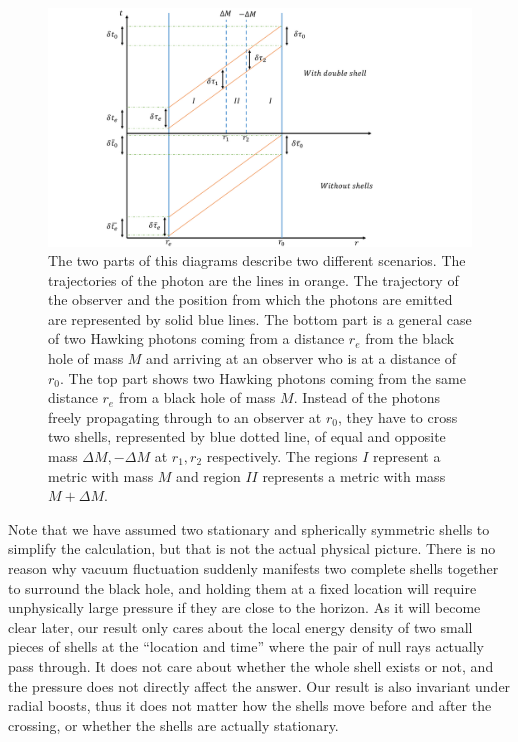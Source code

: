 \documentclass[aps,showpacs,onecolumn,floats,prd,superscriptaddress,nofootinbib]{revtex4-1}
\begin{document}
\begin{figure}[tb]
\begin{center}
\includegraphics[scale = 0.6]{Propertime.pdf}
\caption{The two parts of this diagrams describe two different scenarios. The trajectories of the photon are the lines in orange. The trajectory of the observer and the position from which the photons are emitted are represented by solid blue lines. The bottom part is a general case of two Hawking photons coming from a distance $r_e$ from the black hole of mass $M$ and arriving at an observer who is at a distance of $r_0$. The top part shows two Hawking photons coming from the same distance $r_e$ from a black hole of mass $M$. Instead of the photons freely propagating through to an observer at $r_0$, they have to cross two shells, represented by blue dotted line, of equal and opposite mass $\Delta M, -\Delta M$ at $r_{1}, r_{2}$ respectively. The regions $I$ represent a metric with mass $M$ and region $II$ represents a metric with mass $M+\Delta M$.}
\label{fig-setup}
\end{center}
\end{figure}

Note that we have assumed two stationary and spherically symmetric shells to simplify the calculation, but that is not the actual physical picture.
There is no reason why vacuum fluctuation suddenly manifests two complete shells together to surround the black hole, and holding them at a fixed location will require unphysically large pressure if they are close to the horizon.
As it will become clear later, our result only cares about the local energy density of two small pieces of shells at the ``location and time'' where the pair of null rays actually pass through.
It does not care about whether the whole shell exists or not, and the pressure does not directly affect the answer.
Our result is also invariant under radial boosts, thus it does not matter how the shells move before and after the crossing, or whether the shells are actually stationary.
\end{document}
